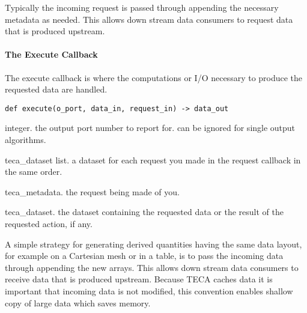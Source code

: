 \documentclass[a4paper,10pt,DIV=12]{scrreprt}
\begin{document}
\noindent Typically the incoming request is passed through appending the necessary metadata as needed. This allows down stream data consumers to request data that is produced upstream.

\paragraph{The Execute Callback}
\noindent The execute callback is where the computations or I/O necessary to produce the requested data are handled.

\begin{verbatim}
def execute(o_port, data_in, request_in) -> data_out
\end{verbatim}
\noindent\hspace{0.25in}\begin{minipage}{0.8\textwidth}
\begin{description}
 \setlength\itemsep{0mm}
 \item[o\_port] integer. the output port number to report for. can be ignored for single output algorithms.
 \item[data\_in] teca\_dataset list. a dataset for each request you made in the request callback in the same order.
 \item[request\_in] teca\_metadata. the request being made of you.
 \item[data\_out] teca\_dataset. the dataset containing the requested data or the result of the requested action, if any.
\end{description}
\vspace{2mm}
\end{minipage}

\noindent A simple strategy for generating derived quantities having the same data layout, for example on a Cartesian mesh or in a table, is to pass the incoming data through appending the new arrays. This allows down stream data consumers to receive data that is produced upstream. Because TECA caches data it is important that incoming data is not modified, this convention enables shallow copy of large data which saves memory.
\end{document}
